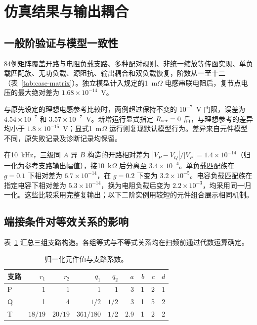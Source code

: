 \section{仿真结果与输出耦合}

\subsection{一般阶验证与模型一致性}

84例矩阵覆盖开路与电阻负载支路、多种配对规则、非统一缩放等传函实现、单负载匹配族、无功负载、源阻抗、输出耦合和双负载恢复，阶数从一至十二（表~\ref{tab:case-matrix}）。独立模型计入规定的1~m$\Omega$ 电感串联电阻后，复节点电压的最大绝对差为 $1.68\times10^{-14}$~V。

与原先设定的理想电感参考比较时，两例超过保持不变的 $10^{-7}$~V 门限，误差为 $4.54\times10^{-7}$ 和 $3.57\times10^{-7}$~V。新增运行显式指定 $R_{\rm ser}=0$ 后，与理想参考的差异均小于 $1.8\times10^{-15}$~V；显式1~m$\Omega$ 运行则复现默认模型行为。差异来自元件模型不同，原失败记录及诊断记录均保留。

在10~kHz，三级同 $A$ 异 $B$ 构造的开路相对差为 $|V_P-V_Q|/|V_P|=1.4\times10^{-14}$（归一化为参考支路输出幅值），接10~k$\Omega$ 后分离至 $3.4\times10^{-4}$。单负载匹配族在 $g=0.1$ 下相对差为 $6.7\times10^{-14}$，在 $g=0.2$ 下变为 $3.2\times10^{-5}$。电容负载匹配族在指定电容下相对差为 $5.3\times10^{-14}$，换为电阻负载后变为 $2.2\times10^{-3}$，均采用同一归一化。这些比较采用完整复输出；以下二阶实例用较短的元件组合展示相同机制。

\subsection{端接条件对等效关系的影响}

表~\ref{tab:branches} 汇总三组支路构造。各组等式与不等式关系均在扫频前通过代数运算确定。

\begin{table}[htbp]
\centering
\caption{归一化元件值与支路系数。}
\label{tab:branches}
\begin{tabular}{lrrrrrrrr}
\toprule
支路 & $r_1$ & $r_2$ & $q_1$ & $q_2$ & $a$ & $b$ & $c$ & $d$ \\
\midrule
P & 1 & 1 & 1 & 1 & 3 & 1 & 2 & 1 \\
Q & 1 & 4 & $1/2$ & $1/2$ & 3 & 1 & 5 & 2 \\
T & $18/19$ & $20/19$ & $361/180$ & $1/2$ & 2.9 & 1 & 2 & 2 \\
\bottomrule
\end{tabular}
\end{table}

